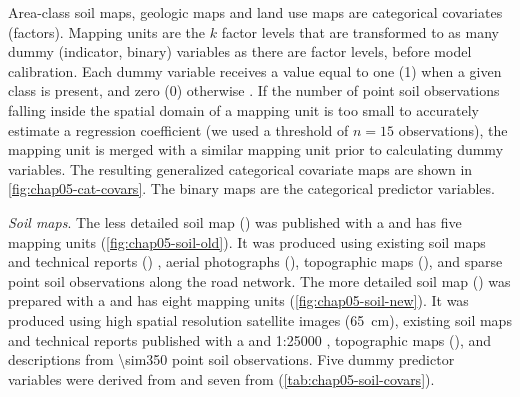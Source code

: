 Area-class soil maps, geologic maps and land use maps are categorical covariates (factors). Mapping units are 
the $k$ factor levels that are transformed to as many dummy (indicator, binary) variables as there are factor 
levels, before model calibration. Each dummy variable receives a value equal to one (\num{1}) when a given 
class is present, and zero (\num{0}) otherwise \cite{Everitt2006}. If the number of point soil observations 
falling inside the spatial domain of a mapping unit is too small to accurately estimate a regression 
coefficient (we used a threshold of $n = 15$ observations), the mapping unit is merged with a similar mapping 
unit prior to calculating dummy variables. The resulting generalized categorical covariate maps are shown in 
\autoref{fig:chap05-cat-covars}. The binary maps are the categorical predictor variables.

\noindent\textit{Soil maps}. The less detailed soil map (\soilOld) was published with a  and 
has five mapping units \cite{AzolinEtAl1988} (\autoref{fig:chap05-soil-old}). It was produced using existing 
soil maps and technical reports () \cite{Brasil1973}, aerial photographs (), 
topographic maps (), and sparse point soil observations along the road network. The more detailed 
soil map (\soilNew) was prepared with a  and has eight mapping units \cite{MiguelEtAl2012} 
(\autoref{fig:chap05-soil-new}). It was produced using high spatial resolution satellite images 
(\SI{65}{\cm}), existing soil maps and technical reports published with a  \cite{Poelking2007} 
and \num{1}:\num{25000} \cite{PedronEtAl2006b}, topographic maps (), and descriptions from 
\num{\sim350} point soil observations. Five dummy predictor variables were derived from \soilOld{} and seven 
from \soilNew{} (\autoref{tab:chap05-soil-covars}).

